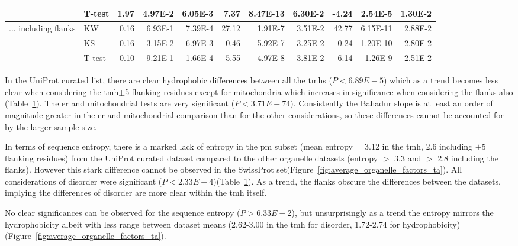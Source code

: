 \begin{table}[htbp]
\begin{tabular}{clrrrrrrrrr}
							&  T-test & 1.97  & 4.97E-2 & 6.05E-3 & 7.37  & 8.47E-13 & 6.30E-2 & -4.24 & 2.54E-5 & 1.30E-2 \\
	\midrule
	\multirow{3}[0]{*}{... including flanks} &  KW & 0.16  & 6.93E-1 & 7.39E-4 & 27.12 & 1.91E-7 & 3.51E-2 & 42.77 & 6.15E-11 & 2.88E-2 \\
							&  KS & 0.16  & 3.15E-2 & 6.97E-3 & 0.46  & 5.92E-7 & 3.25E-2 & 0.24  & 1.20E-10 & 2.80E-2 \\
							&  T-test & 0.10  & 9.21E-1 & 1.66E-4 & 5.55  & 4.97E-8 & 3.81E-2 & -6.14 & 1.26E-9 & 2.51E-2 \\
	\end{tabular}%
					\label{table:organellesuniprotstats}
	\end{table}%

In the UniProt curated list, there are clear hydrophobic differences between all the \gls{tmh}s ($P<6.89E-5$) which as a trend becomes less clear when considering the \gls{tmh}$\pm$5 flanking residues except for mitochondria which increases in significance when considering the flanks also (Table~\ref{table:organellesuniprotstats}).
The \gls{er} and mitochondrial tests are very significant ($P<3.71E-74$).
Consistently the Bahadur slope is at least an order of magnitude greater in the \gls{er} and mitochondrial comparison than for the other considerations, so these differences cannot be accounted for by the larger sample size.

In terms of sequence entropy, there is a marked lack of entropy in the \gls{pm} subset (mean entropy = 3.12 in the \gls{tmh}, 2.6 including $\pm$5 flanking residues) from the UniProt curated dataset compared to the other organelle datasets (entropy $>$ 3.3 and $>$ 2.8 including the flanks).
However this stark difference cannot be observed in the SwissProt set(Figure~\ref{fig:average_organelle_factors_ta}).
All considerations of disorder were significant ($P<2.33E-4$)(Table~\ref{table:organellesuniprotstats}).
As a trend, the flanks obscure the differences between the datasets, implying the differences of disorder are more clear within the \gls{tmh} itself.

No clear significances can be observed for the sequence entropy ($P>6.33E-2$), but unsurprisingly as a trend the entropy mirrors the hydrophobicity albeit with less range between dataset means (2.62-3.00 in the \gls{tmh} for disorder, 1.72-2.74 for hydrophobicity)(Figure~\ref{fig:average_organelle_factors_ta}).


